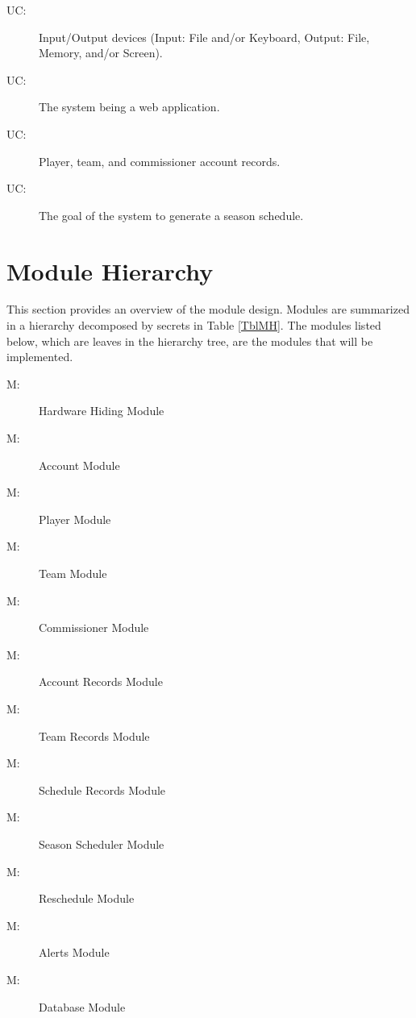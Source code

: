 \documentclass[12pt, titlepage]{article}
\newcounter{ucnum}
\newcommand{\uctheucnum}{UC\theucnum}
\newcounter{mnum}
\newcommand{\mthemnum}{M\themnum}
\begin{document}
\begin{description}
  \item[ \uctheucnum \label{ucIO}:] Input/Output devices
  (Input: File and/or Keyboard, Output: File, Memory, and/or Screen).
  \item[ \uctheucnum \label{ucWeb}:] The system being a
  web application.
  \item[ \uctheucnum \label{ucAccStr}:] Player, team,
  and commissioner account records.
  \item[ \uctheucnum \label{ucSched}:] The goal of the
  system to generate a season schedule.
\end{description}

\section{Module Hierarchy} \label{SecMH}

This section provides an overview of the module design. Modules are summarized
in a hierarchy decomposed by secrets in Table \ref{TblMH}. The modules listed
below, which are leaves in the hierarchy tree, are the modules that will
be implemented.

\begin{description}
  \item [ \mthemnum \label{mHH}:] Hardware Hiding Module
  \item [ \mthemnum \label{mAC}:] Account Module
  \item [ \mthemnum \label{mPL}:] Player Module
  \item [ \mthemnum \label{mTE}:] Team Module
  \item [ \mthemnum \label{mCM}:] Commissioner Module
  \item [ \mthemnum \label{mAS}:] Account Records
  Module
  \item [ \mthemnum \label{mTS}:] Team Records Module
  \item [ \mthemnum \label{mSS}:] Schedule Records
  Module
  \item [ \mthemnum \label{mS}:] Season Scheduler Module
  \item [ \mthemnum \label{mRE}:] Reschedule Module
  \item [ \mthemnum \label{mAL}:] Alerts Module
  \item [ \mthemnum \label{mDB}:] Database Module
\end{description}
\end{document}
